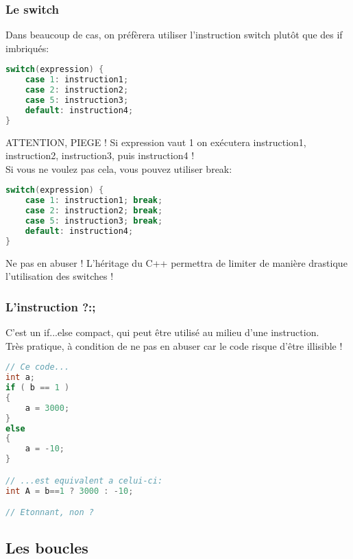 \documentclass{beamer}
\begin{document}
\begin{frame}[fragile=singleslide,shrink=20]
\frametitle {Le switch}

Dans beaucoup de cas, on préfèrera utiliser l'instruction switch plutôt que des if imbriqués:
\begin{lstlisting}[language=c++]
switch(expression) {
    case 1: instruction1;
    case 2: instruction2;
    case 5: instruction3;
    default: instruction4;
}
\end{lstlisting}

\begin{block}{ATTENTION, PIEGE !}
Si expression vaut 1 on exécutera instruction1, instruction2, instruction3, puis instruction4 ! \\
Si vous ne voulez pas cela, vous pouvez utiliser break:
\begin{lstlisting}[language=c++]
switch(expression) {
    case 1: instruction1; break;
    case 2: instruction2; break;
    case 5: instruction3; break;
    default: instruction4;
}
\end{lstlisting}
\end{block}

\begin{block}{Ne pas en abuser !}
L'héritage du C++ permettra de limiter de manière drastique l'utilisation des switches !
\end{block}
\end{frame}

\begin{frame}[fragile=singleslide,shrink=20]
\frametitle {L'instruction ?:;}
C'est un if...else compact, qui peut être utilisé au milieu d'une instruction. \\
Très pratique, à condition de ne pas en abuser car le code risque d'être illisible !

\begin{lstlisting}[language=c++]
// Ce code...
int a;
if ( b == 1 )
{
    a = 3000;
}
else
{
    a = -10;
}

// ...est equivalent a celui-ci:
int A = b==1 ? 3000 : -10;

// Etonnant, non ?
\end{lstlisting}
\end{frame}

\subsection{Les boucles}
\end{document}
